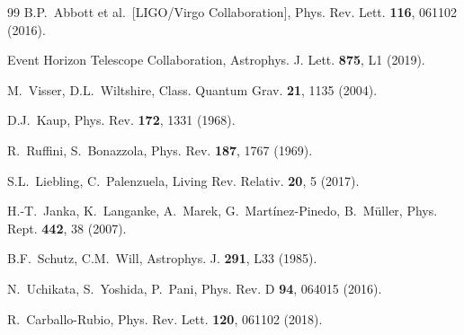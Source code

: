 \documentclass[epj]{svjour}
\begin{document}
\begin{thebibliography}{99}
B.P.~Abbott et al.\ [LIGO/Virgo Collaboration], Phys. Rev. Lett. \textbf{116}, 061102 (2016).

Event Horizon Telescope Collaboration, Astrophys. J. Lett. \textbf{875}, L1 (2019).

M.~Visser, D.L.~Wiltshire, Class. Quantum Grav. \textbf{21}, 1135 (2004).

D.J.~Kaup, Phys. Rev. \textbf{172}, 1331 (1968).

R.~Ruffini, S.~Bonazzola, Phys. Rev. \textbf{187}, 1767 (1969).

S.L.~Liebling, C.~Palenzuela, Living Rev. Relativ. \textbf{20}, 5 (2017).

H.-T.~Janka, K.~Langanke, A.~Marek, G.~Mart\'inez-Pinedo, B.~M\"uller, Phys. Rept. \textbf{442}, 38 (2007).

B.F.~Schutz, C.M.~Will, Astrophys. J. \textbf{291}, L33 (1985).

N.~Uchikata, S.~Yoshida, P.~Pani, Phys. Rev. D \textbf{94}, 064015 (2016).

R.~Carballo-Rubio, Phys. Rev. Lett. \textbf{120}, 061102 (2018).

\end{thebibliography}
\end{document}
